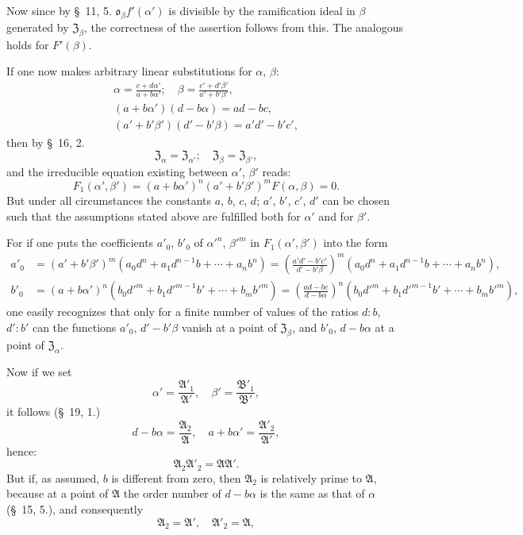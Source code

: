 \documentclass{article}
\begin{document}
Now since by §~11, 5. $\mathfrak{o}_{\beta}f'(\alpha')$ is divisible by the ramification ideal in $\beta$ generated by $\mathfrak{Z}_{\beta}$, the correctness of the assertion follows from this. The analogous holds for $F'(\beta)$.

If one now makes arbitrary linear substitutions for $\alpha$, $\beta$:
\[ \begin{gathered} \alpha = \frac{c+d\alpha'}{a+b\alpha'}; \quad \beta = \frac{c'+d'\beta'}{a'+b'\beta'}, \\ (a+b\alpha')(d-b\alpha) = ad-bc, \\ (a'+b'\beta')(d'-b'\beta) = a'd'-b'c', \end{gathered} \]
then by §~16, 2.
\[ \mathfrak{Z}_{\alpha} = \mathfrak{Z}_{\alpha'}; \quad \mathfrak{Z}_{\beta} = \mathfrak{Z}_{\beta'}, \]
and the irreducible equation existing between $\alpha'$, $\beta'$ reads:
\[ F_{1}(\alpha', \beta') = (a+b\alpha')^{n}(a'+b'\beta')^{m}F(\alpha, \beta) = 0. \]
But under all circumstances the constants $a$, $b$, $c$, $d$; $a'$, $b'$, $c'$, $d'$ can be chosen such that the assumptions stated above are fulfilled both for $\alpha'$ and for $\beta'$.

For if one puts the coefficients $a'_{0}$, $b'_{0}$ of $\alpha'^{n}$, $\beta'^{m}$ in $F_{1}(\alpha', \beta')$ into the form
\[ \begin{aligned} a'_{0} &= (a'+b'\beta')^{m}(a_{0}d^{n} + a_{1}d^{n-1}b + \cdots + a_{n}b^{n}) = \left(\frac{a'd'-b'c'}{d'-b'\beta}\right)^{m}(a_{0}d^{n} + a_{1}d^{n-1}b + \cdots + a_{n}b^{n}), \\ b'_{0} &= (a+b\alpha')^{n}(b_{0}d'^{m} + b_{1}d'^{m-1}b' + \cdots + b_{m}b'^{m}) = \left(\frac{ad-bc}{d-b\alpha}\right)^{n}(b_{0}d'^{m} + b_{1}d'^{m-1}b' + \cdots + b_{m}b'^{m}), \end{aligned} \]
one easily recognizes that only for a finite number of values of the ratios $d : b$, $d' : b'$ can the functions $a'_{0}$, $d'-b'\beta$ vanish at a point of $\mathfrak{Z}_{\beta}$, and $b'_{0}$, $d-b\alpha$ at a point of $\mathfrak{Z}_{\alpha}$.

Now if we set
\[ \alpha' = \frac{\mathfrak{A}'_{1}}{\mathfrak{A}'}, \quad \beta' = \frac{\mathfrak{B}'_{1}}{\mathfrak{B}'}, \]
it follows (§~19, 1.)
\[ d-b\alpha = \frac{\mathfrak{A}_{2}}{\mathfrak{A}}, \quad a+b\alpha' = \frac{\mathfrak{A}'_{2}}{\mathfrak{A}'}, \]
hence:
\[ \mathfrak{A}_{2}\mathfrak{A}'_{2} = \mathfrak{A}\mathfrak{A}'. \]
But if, as assumed, $b$ is different from zero, then $\mathfrak{A}_{2}$ is relatively prime to $\mathfrak{A}$, because at a point of $\mathfrak{A}$ the order number of $d-b\alpha$ is the same as that of $\alpha$ (§~15, 5.), and consequently
\[ \mathfrak{A}_{2} = \mathfrak{A}', \quad \mathfrak{A}'_{2} = \mathfrak{A}, \]
\end{document}
